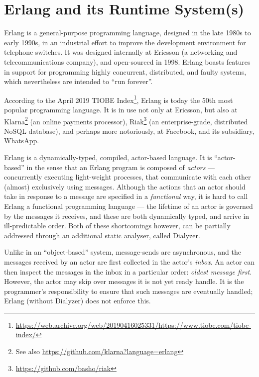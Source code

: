 \section{Erlang and its Runtime System(s)}

Erlang is a general-purpose programming language, designed in the late
1980s to early 1990s, in an industrial effort to improve the
development environment for telephone switches\cite{erlang:hopl:2007}.
It was designed internally at Ericsson (a networking and
telecommunications company), and open-sourced in 1998. Erlang boasts
features in support for programming highly concurrent, distributed,
and faulty systems, which nevertheless are intended to ``run
forever''.

According to the April 2019 TIOBE
Index\footnote{\url{https://web.archive.org/web/20190416025331/https://www.tiobe.com/tiobe-index/}},
Erlang is today the 50th most popular programming language. It is in
use not only at Ericsson\cite{media:2018-03-31:Erlang-20-years}, but
also at
Klarna\cite{media:2015-01-09:Klarna-Engineering-Insights}\footnote{See
also \url{https://github.com/klarna?language=erlang}} (an online
payments processor),
Riak\footnote{\url{https://github.com/basho/riak}} (an
enterprise-grade, distributed NoSQL database), and perhaps more
notoriously, at Facebook\cite{media:2008-03-13:facebook-chat}, and its
subsidiary, WhatsApp\cite{media:2014-02-21:Inside-Erlang}.

Erlang is a dynamically-typed, compiled, actor-based
language\cite{erlang:2019:Erlang-OTP}. It is ``actor-based'' in the
sense that an Erlang program is composed of \emph{actors} ---
concurrently executing light-weight processes, that communicate with
each other (almost) exclusively using messages.  Although the actions
that an actor should take in response to a message are specified in a
\emph{functional} way, it is hard to call Erlang a functional
programming language --- the lifetime of an actor is governed by the
messages it receives, and these are both dynamically typed, and arrive
in ill-predictable order. Both of these shortcomings however, can be
partially addressed through an additional static analyser, called
Dialyzer\cite{erlang:2019:Dialyzer}.

Unlike in an ``object-based'' system, message-sends are asynchronous,
and the messages received by an actor are first collected in the
actor's \emph{inbox}. An actor can then inspect the messages in the
inbox in a particular order: \emph{oldest message first}.  However,
the actor may skip over messages it is not yet ready handle.  It is
the programmer's responsibility to ensure that such messages are
eventually handled; Erlang (without Dialyzer) does not enforce this.


